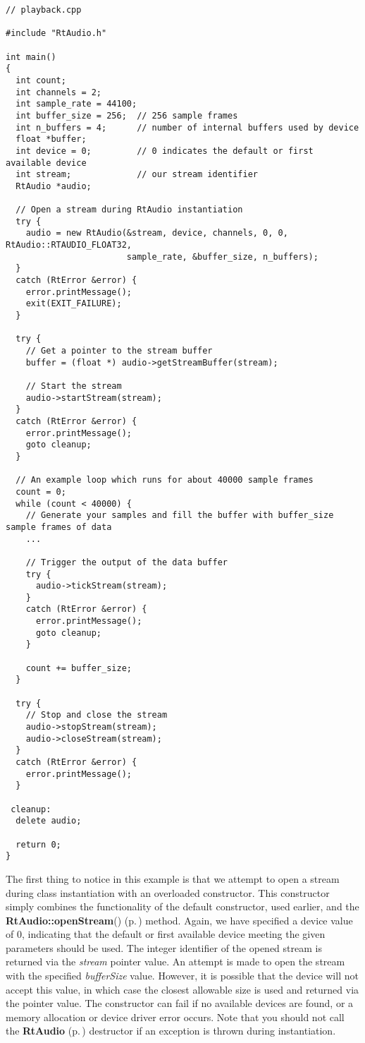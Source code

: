 \footnotesize\begin{verbatim}// playback.cpp

#include "RtAudio.h"

int main()
{
  int count;
  int channels = 2;
  int sample_rate = 44100;
  int buffer_size = 256;  // 256 sample frames
  int n_buffers = 4;      // number of internal buffers used by device
  float *buffer;
  int device = 0;         // 0 indicates the default or first available device
  int stream;             // our stream identifier
  RtAudio *audio;

  // Open a stream during RtAudio instantiation
  try {
    audio = new RtAudio(&stream, device, channels, 0, 0, RtAudio::RTAUDIO_FLOAT32,
                        sample_rate, &buffer_size, n_buffers);
  }
  catch (RtError &error) {
    error.printMessage();
    exit(EXIT_FAILURE);
  }

  try {
    // Get a pointer to the stream buffer
    buffer = (float *) audio->getStreamBuffer(stream);

    // Start the stream
    audio->startStream(stream);
  }
  catch (RtError &error) {
    error.printMessage();
    goto cleanup;
  }

  // An example loop which runs for about 40000 sample frames
  count = 0;
  while (count < 40000) {
    // Generate your samples and fill the buffer with buffer_size sample frames of data
    ...

    // Trigger the output of the data buffer
    try {
      audio->tickStream(stream);
    }
    catch (RtError &error) {
      error.printMessage();
      goto cleanup;
    }

    count += buffer_size;
  }

  try {
    // Stop and close the stream
    audio->stopStream(stream);
    audio->closeStream(stream);
  }
  catch (RtError &error) {
    error.printMessage();
  }

 cleanup:
  delete audio;

  return 0;
}\end{verbatim}\normalsize 


The first thing to notice in this example is that we attempt to open a stream during class instantiation with an overloaded constructor. This constructor simply combines the functionality of the default constructor, used earlier, and the {\bf Rt\-Audio::open\-Stream}() {\rm (p.\,\pageref{classRtAudio_a3})} method. Again, we have specified a device value of 0, indicating that the default or first available device meeting the given parameters should be used. The integer identifier of the opened stream is returned via the {\em stream} pointer value. An attempt is made to open the stream with the specified {\em buffer\-Size} value. However, it is possible that the device will not accept this value, in which case the closest allowable size is used and returned via the pointer value. The constructor can fail if no available devices are found, or a memory allocation or device driver error occurs. Note that you should not call the {\bf Rt\-Audio} {\rm (p.\,\pageref{classRtAudio})} destructor if an exception is thrown during instantiation.

